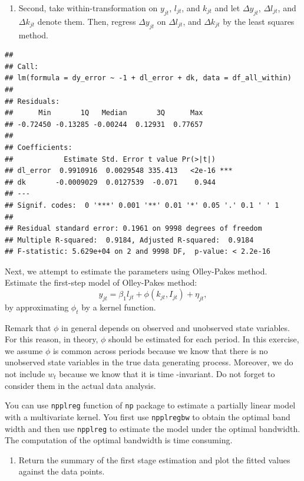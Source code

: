 \documentclass[
]{book}
\providecommand{\tightlist}{%
  \setlength{\itemsep}{0pt}\setlength{\parskip}{0pt}}
\begin{document}
\begin{enumerate}
\def\labelenumi{\arabic{enumi}.}
\setcounter{enumi}{1}
\tightlist
\item
  Second, take within-transformation on \(y_{jt}\), \(l_{jt}\), and \(k_{jt}\) and let \(\Delta y_{jt}\), \(\Delta l_{jt}\), and \(\Delta k_{jt}\) denote them. Then, regress \(\Delta y_{jt}\) on \(\Delta l_{jt}\), and \(\Delta k_{jt}\) by the least squares method.
\end{enumerate}

\begin{verbatim}
## 
## Call:
## lm(formula = dy_error ~ -1 + dl_error + dk, data = df_all_within)
## 
## Residuals:
##      Min       1Q   Median       3Q      Max 
## -0.72450 -0.13285 -0.00244  0.12931  0.77657 
## 
## Coefficients:
##            Estimate Std. Error t value Pr(>|t|)    
## dl_error  0.9910916  0.0029548 335.413   <2e-16 ***
## dk       -0.0009029  0.0127539  -0.071    0.944    
## ---
## Signif. codes:  0 '***' 0.001 '**' 0.01 '*' 0.05 '.' 0.1 ' ' 1
## 
## Residual standard error: 0.1961 on 9998 degrees of freedom
## Multiple R-squared:  0.9184, Adjusted R-squared:  0.9184 
## F-statistic: 5.629e+04 on 2 and 9998 DF,  p-value: < 2.2e-16
\end{verbatim}

Next, we attempt to estimate the parameters using Olley-Pakes method. Estimate the first-step model of Olley-Pakes method:
\[
y_{jt} = \beta_1 l_{jt} + \phi(k_{jt}, I_{jt}) + \eta_{jt},
\]
by approximating \(\phi_t\) by a kernel function.

Remark that \(\phi\) in general depends on observed and unobserved state variables. For this reason, in theory, \(\phi\) should be estimated for each period. In this exercise, we assume \(\phi\) is common across periods because we know that there is no unobserved state variables in the true data generating process. Moreover, we do not include \(w_t\) because we know that it is time -invariant. Do not forget to consider them in the actual data analysis.

You can use \texttt{npplreg} function of \texttt{np} package to estimate a partially linear model with a multivariate kernel. You first use \texttt{npplregbw} to obtain the optimal band width and then use \texttt{npplreg} to estimate the model under the optimal bandwidth. The computation of the optimal bandwidth is time consuming.

\begin{enumerate}
\def\labelenumi{\arabic{enumi}.}
\setcounter{enumi}{2}
\tightlist
\item
  Return the summary of the first stage estimation and plot the fitted values against the data points.
\end{enumerate}
\end{document}
